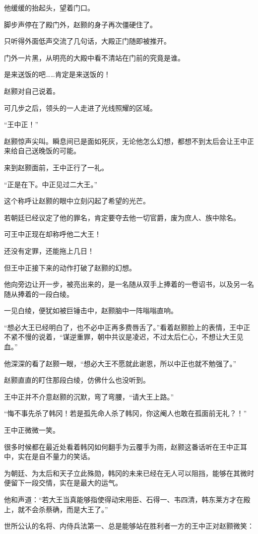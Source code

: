 他缓缓的抬起头，望着门口。

脚步声停在了殿门外，赵颢的身子再次僵硬住了。

只听得外面低声交流了几句话，大殿正门随即被推开。

门外一片黑，从明亮的大殿中看不清站在门前的究竟是谁。

是来送饭的吧……肯定是来送饭的！

赵颢对自己说着。

可几步之后，领头的一人走进了光线照耀的区域。

“王中正！”

赵颢惊声尖叫。瞬息间已是面如死灰，无论他怎么幻想，都想不到太后会让王中正来给自己送晚饭的可能。

来到赵颢面前，王中正行了一礼。

“正是在下。中正见过二大王。”

这个称呼让赵颢的眼中立刻闪起了希望的光芒。

若朝廷已经议定了他的罪名，肯定要夺去他一切官爵，废为庶人、族中除名。

可王中正现在却称呼他二大王！

还没有定罪，还能拖上几日！

但王中正接下来的动作打破了赵颢的幻想。

他向旁边让开一步，被亮出来的，是一名随从双手上捧着的一卷诏书，以及另一名随从捧着的一段白绫。

一见白绫，便犹如被巨锤击中，赵颢脑中一阵嗡嗡直响。

“想必大王已经明白了，也不必中正再多费唇舌了。”看着赵颢脸上的表情，王中正不紧不慢的说着，“谋逆重罪，朝中共议是凌迟，不过太后仁心，不想让大王见血。”

他深深的看了赵颢一眼，“想必大王不愿就此谢恩，所以中正也就不勉强了。”

赵颢直直的盯住那段白绫，仿佛什么也没听到。

王中正并不介意赵颢的沉默，弯了弯腰，“请大王上路。”

“悔不事先杀了韩冈！若是孤先命人杀了韩冈，你这阉人也敢在孤面前无礼？！”

王中正微微一笑。

很多时候都在最近处看着韩冈如何翻手为云覆手为雨，赵颢这番话听在王中正耳中，实在是自不量力的笑话。

为朝廷、为太后和天子立此殊勋，韩冈的未来已经在无人可以阻挡，能够在其微时便留下一段交情，实在是最大的运气。

他和声道：“若大王当真能够指使得动宋用臣、石得一、韦四清，韩东莱方才在殿上，就不会杀蔡确，而是大王了。”

世所公认的名将、内侍兵法第一、总是能够站在胜利者一方的王中正对赵颢微笑：

